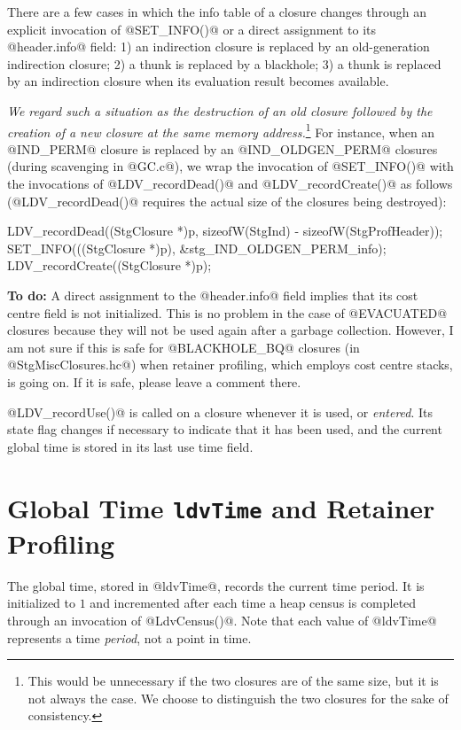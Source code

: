 \documentclass{article}
\begin{document}
There are a few cases in which the info table of a closure changes through
an explicit invocation of @SET_INFO()@ or a direct assignment to its @header.info@
field: 1) an indirection closure is replaced by an old-generation 
indirection closure; 2) a thunk is replaced by a blackhole; 3) a thunk is replaced 
by an indirection closure when its evaluation result becomes available.

\emph{We regard such a situation as
the destruction of an old closure followed by the creation of a new closure
at the same memory address.}\footnote{This would be unnecessary if the two closures
are of the same size, but it is not always the case. We choose to distinguish
the two closures for the sake of consistency.}
For instance, when an @IND_PERM@ closure is replaced by an @IND_OLDGEN_PERM@
closures (during scavenging in @GC.c@), we wrap the invocation of @SET_INFO()@ with 
the invocations of @LDV_recordDead()@ and @LDV_recordCreate()@ as follows 
(@LDV_recordDead()@ requires the actual size of the closures being destroyed):

\begin{code}
  LDV_recordDead((StgClosure *)p, sizeofW(StgInd) - sizeofW(StgProfHeader));
  SET_INFO(((StgClosure *)p), &stg_IND_OLDGEN_PERM_info);
  LDV_recordCreate((StgClosure *)p);
\end{code}

\textbf{To do:}
A direct assignment to the @header.info@ field implies that its cost centre 
field is not initialized. This is no problem in the case of @EVACUATED@ closures 
because they will 
not be used again after a garbage collection. However, I am not sure if this is safe
for @BLACKHOLE_BQ@ closures (in @StgMiscClosures.hc@) when retainer profiling, 
which employs cost centre stacks, is going on. 
If it is safe, please leave a comment there.

@LDV_recordUse()@ is called on a closure whenever it is used, or \emph{entered}.
Its state flag changes if necessary to indicate that it has been used, and
the current global time is stored in its last use time field. 

\section{Global Time \texttt{ldvTime} and Retainer Profiling}

The global time, stored in @ldvTime@, records the current time period.
It is initialized to $1$ and incremented after each time a heap census
is completed through an invocation of @LdvCensus()@.  Note that each
value of @ldvTime@ represents a time \emph{period}, not a point in
time.
\end{document}
